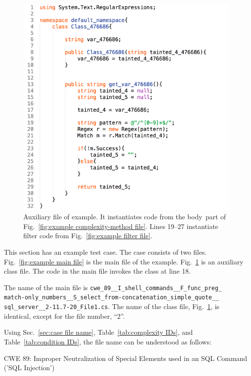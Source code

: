 \documentclass[12pt]{article}
\begin{document}
\begin{figure}[htbp]
  \includegraphics[width=0.85\linewidth]{fig_example_code2.png}
  \caption{Auxiliary file of example.  It instantiates code from the \texlangle body\texrangle\ 
    part of Fig.~\ref{fig:example complexity-method file}.  Lines 19--27 instantiate filter code
    from Fig.~\ref{fig:example filter file}.}
  \label{fig:example aux file}
\end{figure}

This section has an example test case.  The case consists of 
two files.
Fig.~\ref{fig:example main file} is the main file of the example.  
Fig.~\ref{fig:example aux file} is an auxiliary class file.  
The code in
the main file invokes the class at line 18.

The name of the main file is
\verb|cwe_89__I_shell_commands__F_func_preg_| \\
\verb|match-only_numbers__S_select_from-concatenation_simple_quote__| \\
\verb|sql_server__2-11.7-20_File1.cs|.
The name of the class file, Fig.~\ref{fig:example aux file}, is
identical, except for the
file number, ``2''.

Using Sec.~\ref{sec:case file name}, Table~\ref{tab:complexity IDs}, and
Table~\ref{tab:condition IDs}, the file name can be understood as follows:

\noindent CWE 89: Improper Neutralization of Special Elements used in an SQL Command ('SQL Injection')\cite{CWE89}
\end{document}
